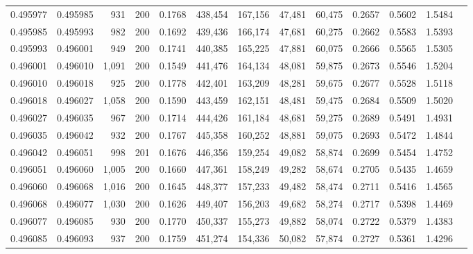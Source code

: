 \begin{tabular}{rrrrrrrrrrrrr}
0.495977 & 0.495985 &   931 & 200 &                                     0.1768 & 438,454 & 167,156 &  47,481 &  60,475 & 0.2657 & 0.5602 & 1.5484 \\
0.495985 & 0.495993 &   982 & 200 &                                     0.1692 & 439,436 & 166,174 &  47,681 &  60,275 & 0.2662 & 0.5583 & 1.5393 \\
0.495993 & 0.496001 &   949 & 200 &                                     0.1741 & 440,385 & 165,225 &  47,881 &  60,075 & 0.2666 & 0.5565 & 1.5305 \\
0.496001 & 0.496010 & 1,091 & 200 &                                     0.1549 & 441,476 & 164,134 &  48,081 &  59,875 & 0.2673 & 0.5546 & 1.5204 \\
0.496010 & 0.496018 &   925 & 200 &                                     0.1778 & 442,401 & 163,209 &  48,281 &  59,675 & 0.2677 & 0.5528 & 1.5118 \\
0.496018 & 0.496027 & 1,058 & 200 &                                     0.1590 & 443,459 & 162,151 &  48,481 &  59,475 & 0.2684 & 0.5509 & 1.5020 \\
0.496027 & 0.496035 &   967 & 200 &                                     0.1714 & 444,426 & 161,184 &  48,681 &  59,275 & 0.2689 & 0.5491 & 1.4931 \\
0.496035 & 0.496042 &   932 & 200 &                                     0.1767 & 445,358 & 160,252 &  48,881 &  59,075 & 0.2693 & 0.5472 & 1.4844 \\
0.496042 & 0.496051 &   998 & 201 &                                     0.1676 & 446,356 & 159,254 &  49,082 &  58,874 & 0.2699 & 0.5454 & 1.4752 \\
0.496051 & 0.496060 & 1,005 & 200 &                                     0.1660 & 447,361 & 158,249 &  49,282 &  58,674 & 0.2705 & 0.5435 & 1.4659 \\
0.496060 & 0.496068 & 1,016 & 200 &                                     0.1645 & 448,377 & 157,233 &  49,482 &  58,474 & 0.2711 & 0.5416 & 1.4565 \\
0.496068 & 0.496077 & 1,030 & 200 &                                     0.1626 & 449,407 & 156,203 &  49,682 &  58,274 & 0.2717 & 0.5398 & 1.4469 \\
0.496077 & 0.496085 &   930 & 200 &                                     0.1770 & 450,337 & 155,273 &  49,882 &  58,074 & 0.2722 & 0.5379 & 1.4383 \\
0.496085 & 0.496093 &   937 & 200 &                                     0.1759 & 451,274 & 154,336 &  50,082 &  57,874 & 0.2727 & 0.5361 & 1.4296 \\

\end{tabular}
